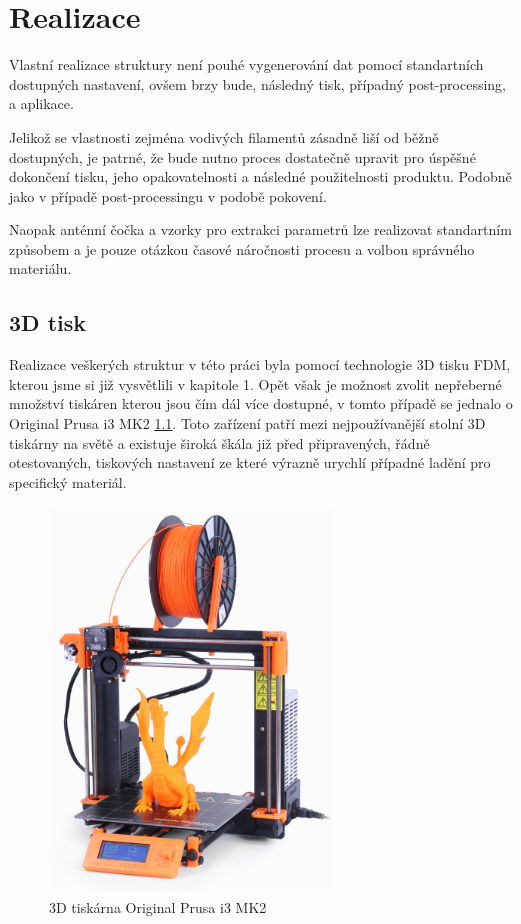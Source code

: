 \chapter{Realizace}

Vlastní realizace struktury není pouhé vygenerování dat pomocí standartních dostupných nastavení, ovšem brzy bude, následný tisk, případný post-processing, a aplikace.

Jelikož se vlastnosti zejména vodivých filamentů zásadně liší od běžně dostupných, je patrné, že bude nutno proces dostatečně upravit pro úspěšné dokončení tisku, jeho opakovatelnosti a následné použitelnosti produktu. Podobně jako v případě post-processingu v podobě pokovení.

Naopak anténní čočka a vzorky pro extrakci parametrů lze realizovat standartním způsobem a je pouze otázkou časové náročnosti procesu a volbou správného materiálu.

\section{3D tisk}
Realizace veškerých struktur v této práci byla pomocí technologie 3D tisku FDM, kterou jsme si již vysvětlili v kapitole 1. Opět však je možnost zvolit nepřeberné množství tiskáren kterou jsou čím dál více dostupné, v tomto případě se jednalo o Original Prusa i3 MK2 \ref{fig:PrinterMK2}. Toto zařízení patří mezi nejpoužívanější stolní 3D tiskárny na světě \cite{3Dhubs} a existuje široká škála již před připravených, řádně otestovaných, tiskových nastavení ze které výrazně urychlí případné ladění pro specifický materiál.

\begin{figure}[!htbp]
\begin{center}
\includegraphics[width=7.5cm]{pics/Printer}
\caption{3D tiskárna Original Prusa i3 MK2}
\label{fig:PrinterMK2}
\end{center}
\end{figure}

